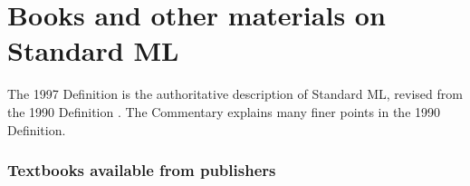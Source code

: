 \documentclass[fleqn]{article}
\begin{document}


\section{Books and other materials on Standard ML}
\label{sec-books}


The 1997 Definition \cite{Milner:1997:TheDefinition} is the
authoritative description of Standard ML, revised from the 1990
Definition \cite{Milner:1990:TheDefinition}\@.  The Commentary
\cite{Milner:1991:Commentary} explains many finer points in the 1990
Definition.


\subsubsection*{Textbooks available from publishers}
\end{document}
